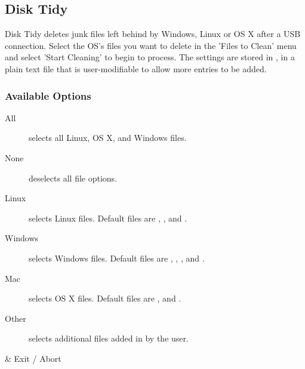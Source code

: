 \subsection{Disk Tidy}
  Disk Tidy deletes junk files left behind by Windows, Linux or OS X after a USB
  connection. Select the OS's files you want to delete in the 'Files to Clean'
  menu and select 'Start Cleaning' to begin to process. The settings
  are stored in , in a plain text
  file that is user-modifiable to allow more entries to be added.

  \subsubsection{Available Options}
  \begin{description}
    \item[All] selects all Linux, OS X, and Windows files.
    \item[None] deselects all file options.
    \item[Linux] selects Linux files. Default files are
      , , and .
    \item[Windows] selects Windows files. Default files are
      , , ,  and
      .
    \item[Mac] selects OS X files. Default files are ,  and
      .
    \item[Other] selects additional files added in by the user.
  \end{description}
  
  \begin{table}
    \begin{btnmap}{}{}
      \ActionStdCancel
      & Exit / Abort\\
    \end{btnmap}
\end{table}
